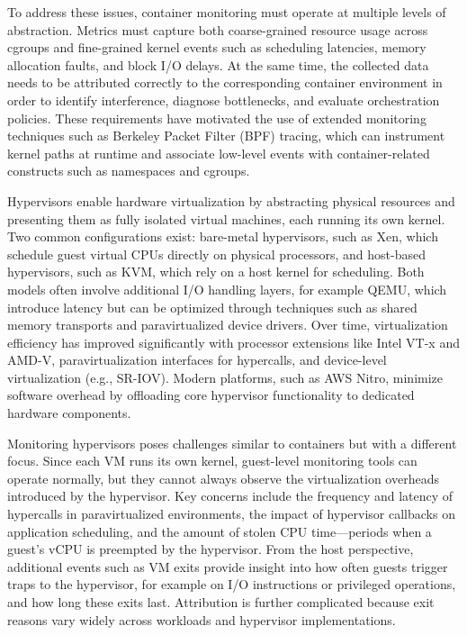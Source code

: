 To address these issues, container monitoring must operate at multiple levels of abstraction. Metrics must capture both coarse-grained resource usage across cgroups and fine-grained kernel events such as scheduling latencies, memory allocation faults, and block I/O delays. At the same time, the collected data needs to be attributed correctly to the corresponding container environment in order to identify interference, diagnose bottlenecks, and evaluate orchestration policies. These requirements have motivated the use of extended monitoring techniques such as Berkeley Packet Filter (BPF) tracing, which can instrument kernel paths at runtime and associate low-level events with container-related constructs such as namespaces and cgroups.

Hypervisors enable hardware virtualization by abstracting physical resources and presenting them as fully isolated virtual machines, each running its own kernel. Two common configurations exist: bare-metal hypervisors, such as Xen, which schedule guest virtual CPUs directly on physical processors, and host-based hypervisors, such as KVM, which rely on a host kernel for scheduling. Both models often involve additional I/O handling layers, for example QEMU, which introduce latency but can be optimized through techniques such as shared memory transports and paravirtualized device drivers. Over time, virtualization efficiency has improved significantly with processor extensions like Intel VT-x and AMD-V, paravirtualization interfaces for hypercalls, and device-level virtualization (e.g., SR-IOV). Modern platforms, such as AWS Nitro, minimize software overhead by offloading core hypervisor functionality to dedicated hardware components.

Monitoring hypervisors poses challenges similar to containers but with a different focus. Since each VM runs its own kernel, guest-level monitoring tools can operate normally, but they cannot always observe the virtualization overheads introduced by the hypervisor. Key concerns include the frequency and latency of hypercalls in paravirtualized environments, the impact of hypervisor callbacks on application scheduling, and the amount of stolen CPU time—periods when a guest’s vCPU is preempted by the hypervisor. From the host perspective, additional events such as VM exits provide insight into how often guests trigger traps to the hypervisor, for example on I/O instructions or privileged operations, and how long these exits last. Attribution is further complicated because exit reasons vary widely across workloads and hypervisor implementations.

